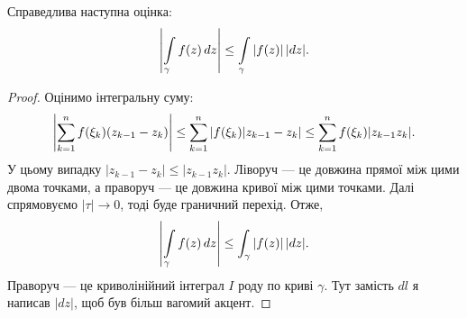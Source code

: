 \documentclass{math_library}
\begin{document}
\begin{theorem}
Справедлива наступна оцінка:
\begin{align*}
\left\lvert\int\displaylimits_{\gamma} f(z)\,dz \right\rvert \leq \int\displaylimits_{\gamma} |f(z)| \,|dz|.
\end{align*}
\end{theorem}

\begin{proof}
Оцінимо інтегральну суму:
\[
\abs{\displaystyle\sum_{k=1}^n f(\xi_k) (z_{k-1}-z_k)} \leq \sum_{k=1}^n |f(\xi_k) |z_{k-1}-z_k| \leq \sum_{k=1}^n f(\xi_k) |z_{k-1}z_k|.
\]
У цьому випадку $|z_{k-1}-z_k| \leq |z_{k-1}z_k|$. Ліворуч --- це довжина прямої між цими двома точками, а праворуч --- це довжина кривої між цими точками. Далі спрямовуємо $|\tau| \to 0$, тоді буде граничний перехід. Отже,
\[
\displaystyle\abs{\int\displaylimits_\gamma f(z)\,dz} \leq \int_\gamma |f(z)|\,|dz|.
\]
Праворуч --- це криволінійний інтеграл $I$ роду по криві $\gamma$. Тут замість $dl$ я написав $|dz|$, щоб був більш вагомий акцент.
\end{proof}
	
\end{document}
